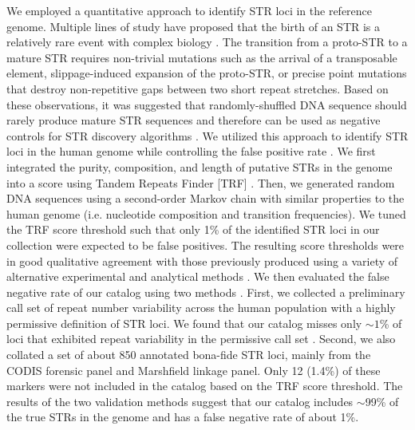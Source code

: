 We employed a quantitative approach to identify STR loci in the reference genome. Multiple lines of study have proposed that the birth of an STR is a relatively rare event with complex biology \cite{Ellegren2004,GemayelVincesLegendreEtAl2010,AnandaWalshJacobEtAl2012,BuschiazzoGemmell2006,OliverSlashinskiWangEtAl2012,KelkarEckertChiaromonteEtAl2011}. The transition from a proto-STR to a mature STR requires non-trivial mutations such as the arrival of a transposable element, slippage-induced expansion of the proto-STR, or precise point mutations that destroy non-repetitive gaps between two short repeat stretches. Based on these observations, it was suggested that randomly-shuffled DNA sequence should rarely produce mature STR sequences and therefore can be used as negative controls for STR discovery algorithms \cite{GemayelVincesLegendreEtAl2010,SchaperKajavaHauserEtAl2012}. We utilized this approach to identify STR loci in the human genome while controlling the false positive rate \cite{SuppWillemsGymrekHighnamEtAl2014}. We first integrated the purity, composition, and length of putative STRs in the genome into a score using Tandem Repeats Finder [TRF] \cite{Benson1999}. Then, we generated random DNA sequences using a second-order Markov chain with similar properties to the human genome (i.e. nucleotide composition and transition frequencies). We tuned the TRF score threshold such that only 1\% of the identified STR loci in our collection were expected to be false positives. The resulting score thresholds were in good qualitative agreement with those previously produced using a variety of alternative experimental and analytical methods \cite{LaiSun2003,FondonMartinRichardsEtAl2012,KelkarStrubczewskiHileEtAl2010} \cite{SuppWillemsGymrekHighnamEtAl2014}. We then evaluated the false negative rate of our catalog using two methods \cite{SuppWillemsGymrekHighnamEtAl2014}. First, we collected a preliminary call set of repeat number variability across the human population with a highly permissive definition of STR loci. We found that our catalog misses only $\sim 1$\% of loci that exhibited repeat variability in the permissive call set \cite{SuppWillemsGymrekHighnamEtAl2014}. Second, we also collated a set of about 850 annotated bona-fide STR loci, mainly from the CODIS forensic panel and Marshfield linkage panel. Only 12 (1.4\%) of these markers were not included in the catalog based on the TRF score threshold. The results of the two validation methods suggest that our catalog includes $\sim$99\% of the true STRs in the genome and has a false negative rate of about 1\%. 

